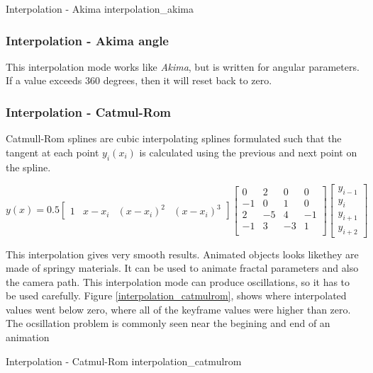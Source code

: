 {Interpolation - Akima}
{interpolation_akima}

\subsubsection{Interpolation - Akima angle}\label{interpolation-akima-angle}

This interpolation mode works like \emph{Akima}, but is written for angular
parameters. If a value exceeds 360 degrees, then it will reset back to zero.

\subsubsection{Interpolation - Catmul-Rom}\label{interpolation-catmul-rom}

Catmull-Rom splines are cubic interpolating splines formulated such that the
tangent at each point $ y_i(x_i) $ is calculated using the previous and next
point on the spline.

\[ y(x) = 0.5 \begin{bmatrix} 1 & x-x_i & (x-x_i)^2 & (x-x_i)^3\end{bmatrix}
\begin{bmatrix} 0 & 2 & 0 & 0 \\ -1 & 0 & 1 & 0 \\ 2 & -5 & 4 & -1 \\ -1 & 3 &
-3 & 1 \\ \end{bmatrix} \begin{bmatrix} y_{i-1} \\ y_i \\ y_{i+1} \\ y_{i+2}
\end{bmatrix} \]

This interpolation gives very smooth results. Animated objects looks likethey are made
of springy materials. It can be used to animate fractal parameters and also the
camera path. This interpolation mode can produce oscillations, so it has to be used
carefully. Figure \ref{interpolation_catmulrom}, 
shows where interpolated values went below zero,  where all of the keyframe values were higher than zero. The ocsillation problem is commonly seen near the begining and end of an animation

{Interpolation - Catmul-Rom}
{interpolation_catmulrom}

